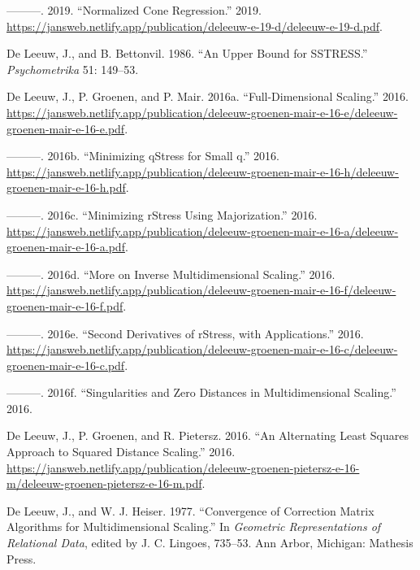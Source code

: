 \documentclass[
  12pt,
  letterpaper,
  DIV=11,
  numbers=noendperiod]{scrreprt}
\newlength{\cslhangindent}
\newenvironment{CSLReferences}[2] %
 {\begin{list}{}{%
  \setlength{\itemindent}{0pt}
  \setlength{\leftmargin}{0pt}
  \setlength{\parsep}{0pt}
  \ifodd #1
   \setlength{\leftmargin}{\cslhangindent}
   \setlength{\itemindent}{-1\cslhangindent}
  \fi
  \setlength{\itemsep}{#2\baselineskip}}}
 {\end{list}}
\theoremstyle{remark}
\begin{document}
\begin{CSLReferences}{1}{0}
---------. 2019. {``Normalized Cone Regression.''} 2019.
\url{https://jansweb.netlify.app/publication/deleeuw-e-19-d/deleeuw-e-19-d.pdf}.

De Leeuw, J., and B. Bettonvil. 1986. {``An Upper Bound for
{SSTRESS}.''} \emph{Psychometrika} 51: 149--53.

De Leeuw, J., P. Groenen, and P. Mair. 2016a. {``Full-Dimensional
Scaling.''} 2016.
\url{https://jansweb.netlify.app/publication/deleeuw-groenen-mair-e-16-e/deleeuw-groenen-mair-e-16-e.pdf}.

---------. 2016b. {``Minimizing qStress for Small q.''} 2016.
\url{https://jansweb.netlify.app/publication/deleeuw-groenen-mair-e-16-h/deleeuw-groenen-mair-e-16-h.pdf}.

---------. 2016c. {``{Minimizing rStress Using Majorization}.''} 2016.
\url{https://jansweb.netlify.app/publication/deleeuw-groenen-mair-e-16-a/deleeuw-groenen-mair-e-16-a.pdf}.

---------. 2016d. {``More on Inverse Multidimensional Scaling.''} 2016.
\url{https://jansweb.netlify.app/publication/deleeuw-groenen-mair-e-16-f/deleeuw-groenen-mair-e-16-f.pdf}.

---------. 2016e. {``{Second Derivatives of rStress, with
Applications}.''} 2016.
\url{https://jansweb.netlify.app/publication/deleeuw-groenen-mair-e-16-c/deleeuw-groenen-mair-e-16-c.pdf}.

---------. 2016f. {``Singularities and Zero Distances in
Multidimensional Scaling.''} 2016.

De Leeuw, J., P. Groenen, and R. Pietersz. 2016. {``An Alternating Least
Squares Approach to Squared Distance Scaling.''} 2016.
\url{https://jansweb.netlify.app/publication/deleeuw-groenen-pietersz-e-16-m/deleeuw-groenen-pietersz-e-16-m.pdf}.

De Leeuw, J., and W. J. Heiser. 1977. {``Convergence of Correction
Matrix Algorithms for Multidimensional Scaling.''} In \emph{Geometric
Representations of Relational Data}, edited by J. C. Lingoes, 735--53.
Ann Arbor, Michigan: Mathesis Press.


\end{CSLReferences}
\end{document}
